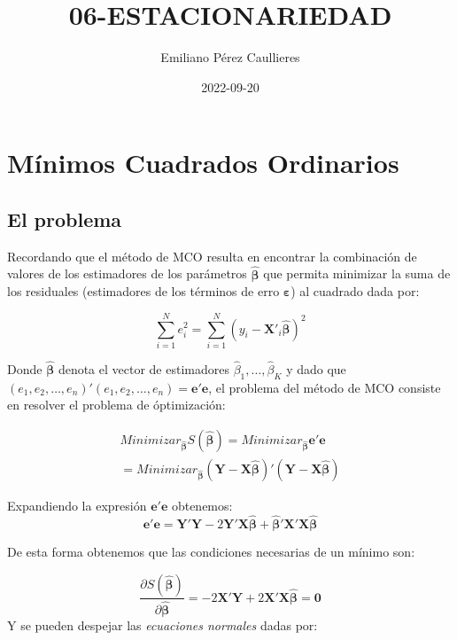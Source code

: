 \documentclass[
]{book}
\title{06-ESTACIONARIEDAD}
\author{Emiliano Pérez Caullieres}
\date{2022-09-20}
\begin{document}
\maketitle

{
\setcounter{tocdepth}{1}
\tableofcontents
}
\hypertarget{muxednimos-cuadrados-ordinarios}{%
\chapter{Mínimos Cuadrados Ordinarios}\label{muxednimos-cuadrados-ordinarios}}

\hypertarget{el-problema}{%
\section{El problema}\label{el-problema}}

Recordando que el método de MCO resulta en encontrar la combinación de valores de los estimadores de los parámetros \(\hat{\boldsymbol{\beta}}\) que permita minimizar la suma de los residuales (estimadores de los términos de erro \(\boldsymbol{\varepsilon}\)) al cuadrado dada por:

\[
    \sum^{N}_{i=1}{e^2_i} = \sum^{N}_{i = 1}{(y_i - \mathbf{X}'_i \hat{\boldsymbol{\beta}})^2}
\]

Donde \(\hat{\boldsymbol{\beta}}\) denota el vector de estimadores \(\hat{\beta}_1, \ldots, \hat{\beta}_K\) y dado que \((e_1, e_2, \ldots, e_n)'(e_1, e_2, \ldots, e_n) = {\mathbf{e'e}}\), el problema del método de MCO consiste en resolver el problema de óptimización:

\begin{eqnarray*}
Minimizar_{\hat{\boldsymbol \beta}} S(\hat{\boldsymbol \beta})  =  Minimizar_{\hat{\boldsymbol \beta}} \mathbf{e'e} \\
    =  Minimizar_{\hat{\boldsymbol \beta}} (\mathbf{Y}-\mathbf{X}\hat{\boldsymbol \beta})'(\mathbf{Y}-\mathbf{X}\hat{\boldsymbol \beta})
\end{eqnarray*}

Expandiendo la expresión \(\mathbf{e'e}\) obtenemos:
\[
    \mathbf{e'e} = \mathbf{Y'Y} - 2 \mathbf{Y'X} \hat{\boldsymbol \beta} + \hat{\boldsymbol \beta}' \mathbf{X'X}\hat{\boldsymbol \beta}
\]

De esta forma obtenemos que las condiciones necesarias de un mínimo son:

\[
    \frac{\partial S(\hat{\boldsymbol \beta})}{\partial \hat{\boldsymbol \beta}} = -2{\mathbf{X'Y}} + 2{\mathbf{X'X}} \hat{\boldsymbol{\beta}} = \mathbf{0}
\]
Y se pueden despejar las \textit{ecuaciones normales} dadas por:
\end{document}
